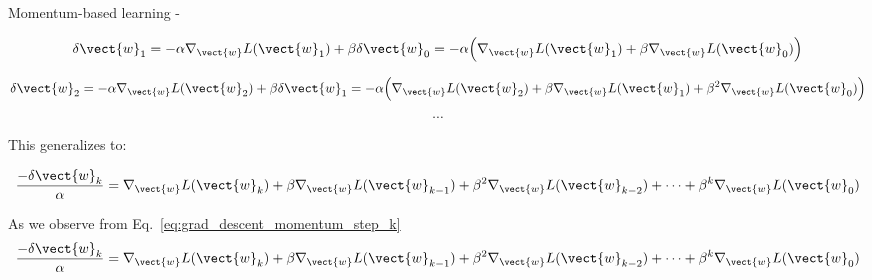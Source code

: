 \begin{frame}[t,allowframebreaks]{
    Momentum-based learning -}
    \vspace{-0.1cm}

    \begin{equation*}
        \delta \vect{w}_{1} = 
        - \alpha \nabla_{\vect{w}} L(\vect{w}_{1})
        + \beta \delta \vect{w}_{0} =
        - \alpha \Big(
            \nabla_{\vect{w}} L(\vect{w}_{1}) +
            \beta \nabla_{\vect{w}} L(\vect{w}_{0})
        \Big)
    \end{equation*}

    \vspace{-0.4cm}

    \begin{equation*}
        \delta \vect{w}_{2} = 
        - \alpha \nabla_{\vect{w}} L(\vect{w}_{2})
        + \beta \delta \vect{w}_{1} = %
        - \alpha \Big(
            \nabla_{\vect{w}} L(\vect{w}_{2}) +
            \beta \nabla_{\vect{w}} L(\vect{w}_{1}) +
            \beta^2 \nabla_{\vect{w}} L(\vect{w}_{0})
        \Big)
    \end{equation*}

    \begin{equation*}
        \cdots
    \end{equation*}

    \vspace{0.1cm}

    This generalizes to:\\

    \vspace{-0.4cm}

    \begin{equation}
        \frac{-\delta \vect{w}_{k}}{\alpha} = 
            \nabla_{\vect{w}} L(\vect{w}_{k}) +
            \beta \nabla_{\vect{w}} L(\vect{w}_{k-1}) +
            \beta^2 \nabla_{\vect{w}} L(\vect{w}_{k-2}) + 
            \cdots + 
            \beta^k \nabla_{\vect{w}} L(\vect{w}_{0}) 
        \label{eq:grad_descent_momentum_step_k}
    \end{equation}

    \framebreak


    As we observe from Eq.~\ref{eq:grad_descent_momentum_step_k}
    \begin{equation*}
        \frac{-\delta \vect{w}_{k}}{\alpha} = 
            \nabla_{\vect{w}} L(\vect{w}_{k}) +
            \beta \nabla_{\vect{w}} L(\vect{w}_{k-1}) +
            \beta^2 \nabla_{\vect{w}} L(\vect{w}_{k-2}) + 
            \cdots + 
            \beta^k \nabla_{\vect{w}} L(\vect{w}_{0}) 
    \end{equation*}


\end{frame}
